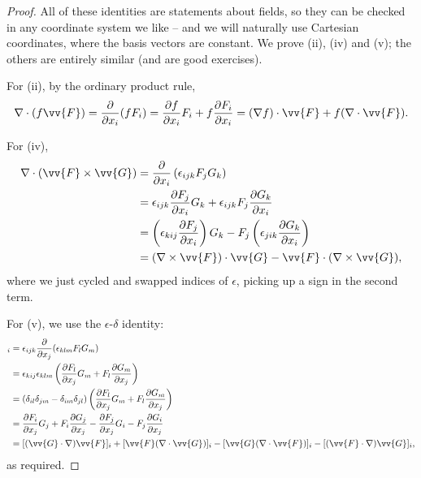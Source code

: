 \begin{proof}
	All of these identities are statements about fields, so they can be checked in any coordinate system we like -- and we will naturally use Cartesian coordinates, where the basis vectors are constant. We prove (ii), (iv) and (v); the others are entirely similar (and are good exercises).

	For (ii), by the ordinary product rule,
	$$
	\nabla \cdot (f \vv{F}) = \frac{\partial}{\partial x_i}(f F_i) = \frac{\partial f}{\partial x_i} F_i + f \frac{\partial F_i}{\partial x_i} = (\nabla f) \cdot \vv{F} + f (\nabla \cdot \vv{F}).
	$$

	For (iv),
	\begin{align*}
		\nabla \cdot (\vv{F} \times \vv{G}) &= \frac{\partial}{\partial x_i} \left(\epsilon_{ijk} F_j G_k\right) \\
		&= \epsilon_{ijk} \frac{\partial F_j}{\partial x_i} G_k + \epsilon_{ijk} F_j \frac{\partial G_k}{\partial x_i} \\
		&= \left(\epsilon_{kij} \frac{\partial F_j}{\partial x_i}\right) G_k - F_j \left(\epsilon_{jik} \frac{\partial G_k}{\partial x_i}\right) \\
		&= (\nabla \times \vv{F}) \cdot \vv{G} - \vv{F} \cdot (\nabla \times \vv{G}),
	\end{align*}
	where we just cycled and swapped indices of $\epsilon$, picking up a sign in the second term.

	For (v), we use the $\epsilon$-$\delta$ identity:
	\begin{align*}
		[\nabla \times (\vv{F} \times \vv{G})]_i &= \epsilon_{ijk} \frac{\partial}{\partial x_j} (\epsilon_{klm} F_l G_m) \\
		&= \epsilon_{kij}\epsilon_{klm} \left(\frac{\partial F_l}{\partial x_j} G_m + F_l \frac{\partial G_m}{\partial x_j}\right) \\
		&= (\delta_{il}\delta_{jm} - \delta_{im}\delta_{jl}) \left(\frac{\partial F_l}{\partial x_j} G_m + F_l \frac{\partial G_m}{\partial x_j}\right) \\
		&= \frac{\partial F_i}{\partial x_j} G_j + F_i \frac{\partial G_j}{\partial x_j} - \frac{\partial F_j}{\partial x_j} G_i - F_j \frac{\partial G_i}{\partial x_j} \\
		&= [(\vv{G} \cdot \nabla)\vv{F}]_i + [\vv{F}(\nabla \cdot \vv{G})]_i - [\vv{G}(\nabla \cdot \vv{F})]_i - [(\vv{F} \cdot \nabla)\vv{G}]_i,
	\end{align*}
	as required.
\end{proof}

